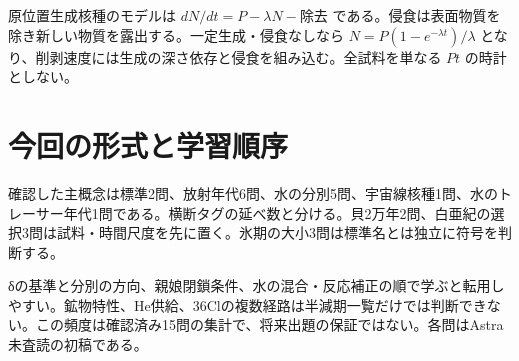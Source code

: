 原位置生成核種のモデルは \(dN/dt=P-\lambda N-\text{除去}\) である。侵食は表面物質を除き新しい物質を露出する。一定生成・侵食なしなら \(N=P(1-e^{-\lambda t})/\lambda\) となり、削剥速度には生成の深さ依存と侵食を組み込む。全試料を単なる \(Pt\) の時計としない。

\section{今回の形式と学習順序}
確認した主概念は標準2問、放射年代6問、水の分別5問、宇宙線核種1問、水のトレーサー年代1問である。横断タグの延べ数と分ける。貝2万年2問、白亜紀の選択3問は試料・時間尺度を先に置く。氷期の大小3問は標準名とは独立に符号を判断する。

δの基準と分別の方向、親娘閉鎖条件、水の混合・反応補正の順で学ぶと転用しやすい。鉱物特性、He供給、36Clの複数経路は半減期一覧だけでは判断できない。この頻度は確認済み15問の集計で、将来出題の保証ではない。各問はAstra未査読の初稿である。

